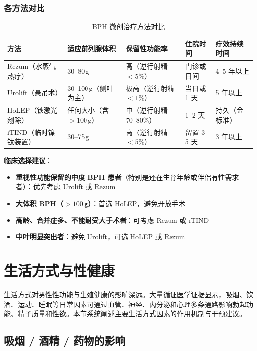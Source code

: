 \begin{enumerate}
\subsubsection{各方法对比}

\begin{table}[htbp]
\centering
\caption{BPH 微创治疗方法对比}
\label{tab:bph_minimal_invasive}
\begin{tabularx}{\textwidth}{@{}lXXXX@{}}
    \toprule
    \textbf{方法} & \textbf{适应前列腺体积} & \textbf{保留性功能率} & \textbf{住院时间} & \textbf{疗效持续时间} \\
    \midrule
    Rezum（水蒸气热疗） & 30--80\,g & 高（逆行射精 $<5\%$） & 门诊或日间 & 4--5 年以上 \\
    Urolift（悬吊术） & 30--100\,g（侧叶为主） & 极高（逆行射精 $<1\%$） & 当日或 1 天 & 5 年以上 \\
    HoLEP（钬激光剜除） & 任何大小（含 $>100$\,g） & 中（逆行射精 70--80\%） & 1--2 天 & 持久（金标准） \\
    iTIND（临时镍钛装置） & 30--75\,g & 高（逆行射精 $<5\%$） & 留置 3--5 天 & 3 年以上 \\
    \bottomrule
\end{tabularx}
\end{table}

\noindent\textbf{临床选择建议}：
\begin{itemize}[leftmargin=2cm]
	\item \textbf{重视性功能保留的中度 BPH 患者}（特别是还在生育年龄或伴侣有性需求者）：优先考虑 Urolift 或 Rezum
	\item \textbf{大体积 BPH（$>100$\,g）}：首选 HoLEP，避免开放手术
	\item \textbf{高龄、合并症多、不能耐受大手术者}：可考虑 Rezum 或 iTIND
	\item \textbf{中叶明显突出者}：避免 Urolift，可选 HoLEP 或 Rezum
\end{itemize}

\section{生活方式与性健康}

生活方式对男性性功能与生殖健康的影响深远。大量循证医学证据显示，吸烟、饮酒、运动、睡眠等日常因素可通过血管、神经、内分泌和心理多条通路影响勃起功能、精子质量和性欲。本节系统阐述主要生活方式因素的作用机制与干预建议。

\subsection{吸烟 / 酒精 / 药物的影响}


\end{enumerate}
